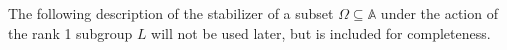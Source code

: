 \documentclass[12pt]{amsart}
\newcommand{\F}{\mathbb{F} }
\newcommand{\A}{\mathbb{A}}
\numberwithin{equation}{section}
\newtheorem{proposition}[theorem]{Proposition}
\theoremstyle{remark} %
\begin{document}
		
		The following description of the stabilizer of a subset $\Omega \subseteq \A$ under the action of the rank 1 subgroup $L$ will not be used later, but is included for completeness. 
		
\end{document}
